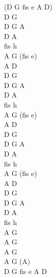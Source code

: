 \documentclass[a5paper, 10pt]{book}
\begin{document}
\begin{minipage}[t]{0.3\textwidth}
(D G fis e A D)\\
D G\\
D G A\\
D A\\
fis h\\
A G (fis e)\\
A D\\

D G\\
D G A\\
D A\\
fis h\\
A G (fis e)\\
A D\\

D G\\
D G A\\
D A\\
fis h\\
A G (fis e)\\
A D\\

D G\\
D G A\\
D A\\
fis h\\
A G\\
A G\\
A G\\
A G (A)\\
D G fis e A D\\
\end{minipage}

\newpage
\end{document}
